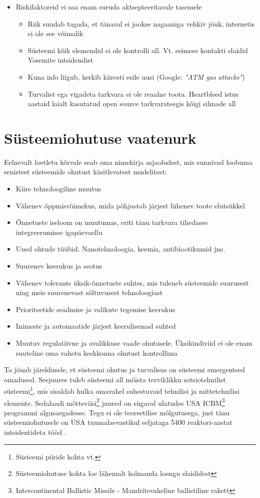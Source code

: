 \documentclass{tufte-book}
\begin{document}
\begin{itemize}
		\item Riskifaktoreid ei saa enam suruda aktsepteeritavale tasemele
			\begin{itemize}
		\item Riik suudab tagada, et tänaval ei jookse nagaaniga vehkiv jõuk, internetis ei ole see võimalik
		\item Süsteemi kõik elemendid ei ole kontrolli all. Vt. esimese kontakti slaidid Yosemite intsidendist
		\item Kuna info liigub, kerkib kiiresti esile uusi (Google: \emph{"ATM gas attacks"})
		\item Turvalist ega vigadeta tarkvara ei ole reaalne toota. Heartbleed istus aastaid laialt kasutatud open source tarkvarateegis kõigi silmade all
	\end{itemize}

\end{itemize}

\section{Süsteemiohutuse vaatenurk}
Eelnevalt loetletu kõrvale seab \cite{leveson2011engineering} oma nimekirja asjaoludest, mis sunnivad loobuma senistest süsteemide ohutust käsitlevatest mudelitest:
\begin{itemize}
	\item Kiire tehnoloogiline muutus
	\item Vähenev õppmisvõimekus, mida põhjustab järjest lühenev toote elutsükkel
	\item Õnnetuste iseloom on muutumas, eriti tänu tarkvara tihedasse integreerumisse igapäevaellu
	\item Uued ohtude tüübid. Nanotehnoloogia, keemia, antibiootikumid jne.
	\item Suurenev keerukus ja seotus
	\item Vähenev tolerants üksik-õnnetuste suhtes, mis tuleneb süsteemide suurusest ning meie suurenevast sõltuvusest tehnoloogiast
	\item Prioriteetide seadmise ja valikute tegemise keerukus
	\item Inimeste ja automaatide järjest keerulisemad suhted
	\item Muutuv regulatiivne ja avalikkuse vaade ohutusele. Üksikindiviid ei ole enam suuteline oma vahetu keskkonna ohutust kontrollima
\end{itemize}

Ta jõuab järeldusele, et süsteemi ohutus ja turvalisus on süsteemi emergentsed omadused. Seejuures tuleb süsteemi all mõista terviklikku sotsiotehnilist süsteemi\footnote{Süsteemi piiride kohta vt. }, mis sisaldab hulka omavahel suhestuvaid tehnilisi ja mittetehnilisi elemente. Sedalaadi mõtteviisi\footnote{Süsteemiohutuse kohta loe lähemalt kolmanda loengu slaididest} juured on sügaval ulatudes USA ICBM\footnote{Intercontinental Ballistic Missile - Mandritevaheline ballistiline rakett} programmi algusaegadesse. Tegu ei ole teoreetilise mõlgutusega, just tänu süsteemiohutusele on USA tuumalaevastikul seljataga 5400 reaktori-aastat intsidentideta tööd \cite{navy}. 
\end{document}
